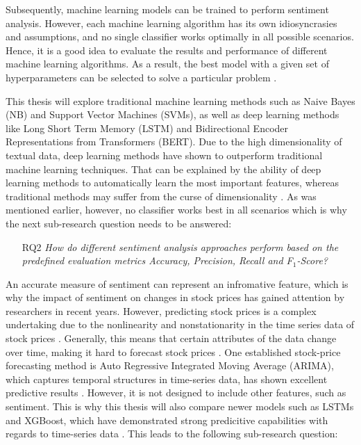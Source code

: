 \documentclass[11pt, a4paper]{article}
\begin{document}
Subsequently, machine learning models can be trained to perform sentiment analysis. However, 
each machine learning algorithm has its own idiosyncrasies and assumptions, and no single classifier 
works optimally in all possible scenarios. Hence, it is a good idea to evaluate the results and 
performance of different machine learning algorithms. As a result, the best model with a given set 
of hyperparameters can be selected to solve a particular problem \citep[p. 53]{raschka2019pythonmachinelearning}. 

This thesis will explore traditional machine learning methods such as Naive Bayes (NB) 
and Support Vector Machines (SVMs), as well as deep learning methods like 
Long Short Term Memory (LSTM) and Bidirectional Encoder Representations from 
Transformers (BERT). %
Due to the high dimensionality of textual data, deep learning methods have shown 
to outperform traditional machine learning techniques. That can be explained by the 
ability of deep learning methods to automatically learn the most important features, whereas traditional 
methods may suffer from the curse of dimensionality \citep{fu2018lexiconenhancedlstm}.
As was mentioned earlier, however, no classifier works best in all scenarios which is why the next sub-research question needs to be answered:

\begin{itemize}
    \item[RQ2] \emph{How do different sentiment analysis approaches perform based on the predefined evaluation metrics Accuracy, Precision, Recall and F$_1$-Score?}
\end{itemize}

An accurate measure of sentiment can represent an infromative feature, which is why the impact of sentiment on changes in stock prices has gained attention by researchers in recent years.
However, predicting stock prices is a complex undertaking due to the nonlinearity and nonstationarity in the time series data of stock prices \citep{mahla2019stockpriceprediction}. Generally, this means that certain
attributes of the data change over time, making it hard to forecast stock prices \citep{shetty2021nonstationary}. One established stock-price forecasting method is Auto Regressive Integrated Moving
Average (ARIMA), which captures temporal structures in time-series data, has shown excellent predictive results \citep{caginalp1995arima}. However, it is not designed to include other features, such as sentiment.
This is why this thesis will also compare newer models such as LSTMs and XGBoost, which have demonstrated strong predicitive capabilities with regards to time-series data \citep{chen2021meanvariance}.
This leads to the following sub-research question:
\end{document}
